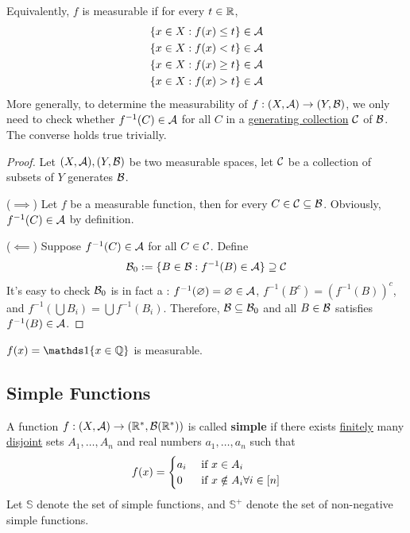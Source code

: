 \documentclass[11pt]{article}
\begin{document}
	\begin{proposition}
		Equivalently, $f$ is measurable if for every $t \in \mathbb{R}$,
		\begin{align}
			\{x \in X : f(x) \leq t\} \in \mathcal{{A}} \\
			\{x \in X : f(x) < t\} \in \mathcal{{A}} \\
			\{x \in X : f(x) \geq t\} \in \mathcal{{A}} \\
			\{x \in X : f(x) > t\} \in \mathcal{{A}}
		\end{align}
		More generally, to determine the measurability of $f: (X, \mathcal{{A}}) \to (Y, \mathcal{{B}})$, we only need to check whether $f^{-1}(C) \in \mathcal{{A}}$ for all $C$ in a \ul{generating collection} $\mathcal{{C}}$ of $\mathcal{{B}}$. The converse holds true trivially.

		\begin{proof}
			Let $(X, \mathcal{{A}}), (Y, \mathcal{{B}})$ be two measurable spaces, let $\mathcal{{C}}$ be a collection of subsets of $Y$ generates $\mathcal{{B}}$.
			
			($\implies$) Let $f$ be a measurable function, then for every $C \in \mathcal{{C}} \subseteq \mathcal{{B}}$. Obviously, $f^{-1}(C) \in \mathcal{{A}}$ by definition.
			
			($\impliedby$) Suppose $f^{-1}(C) \in \mathcal{{A}}$ for all $C \in \mathcal{{C}}$. Define
			\begin{align}
				\mathcal{{B}}_0 := \{B \in \mathcal{{B}} : f^{-1}(B) \in \mathcal{{A}}\} \supseteq \mathcal{{C}}
			\end{align}
			It's easy to check $\mathcal{{B}}_0$ is in fact a \salg: $f^{-1}(\varnothing) = \varnothing \in \mathcal{{A}}$, $f^{-1}(B^c) = (f^{-1}(B))^c$, and $f^{-1}(\bigcup B_i) = \bigcup f^{-1}(B_i)$. Therefore, $\mathcal{{B}} \subseteq \mathcal{{B}}_0$ and all $B \in \mathcal{{B}}$ satisfies $f^{-1}(B) \in \mathcal{{A}}$.
		\end{proof}
	\end{proposition}
	
	\begin{example}
		$f(x) = \id{x \in \Q}$ is measurable.
	\end{example}
	
	\subsection{Simple Functions}
	\begin{definition}
		A function $f: (X, \mathcal{{A}}) \to (\mathbb{R}^*, \mathcal{{B}}(\mathbb{R}^*))$ is called \textbf{simple} if there exists \ul{finitely} many \ul{disjoint} sets $A_1, \dots, A_n$ and real numbers $a_1, \dots, a_n$ such that
		\begin{align}
			f(x) = \begin{cases}
				a_i &\text{{ if }} x \in A_i \\
				0 &\text{{ if }} x \notin A_i \forall i \in [n]
			 \end{cases}
		\end{align}
		Let $\mathds{S}$ denote the set of simple functions, and $\mathds{S}^+$ denote the set of non-negative simple functions.
	\end{definition}
	
\end{document}
